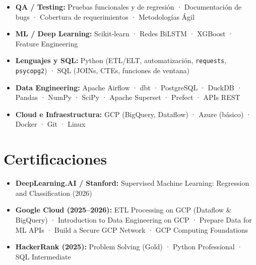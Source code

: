 \documentclass[a4paper,10pt]{article}
\begin{document}
\begin{itemize}
  \item \textbf{QA / Testing:} Pruebas funcionales y de regresi\'{o}n · Documentaci\'{o}n de bugs
        · Cobertura de requerimientos · Metodolog\'{i}as \'{A}gil
  \item \textbf{ML / Deep Learning:} Scikit-learn · Redes BiLSTM · XGBoost · Feature Engineering
  \item \textbf{Lenguajes y SQL:} Python (ETL/ELT, automatizaci\'{o}n, \texttt{requests}, \texttt{psycopg2})
        · SQL (JOINs, CTEs, funciones de ventana)
  \item \textbf{Data Engineering:} Apache Airflow · dbt · PostgreSQL · DuckDB · Pandas · NumPy
        · SciPy · Apache Superset · Prefect · APIs REST
  \item \textbf{Cloud e Infraestructura:} GCP (BigQuery, Dataflow) · Azure (b\'{a}sico) · Docker · Git · Linux
\end{itemize}

\section{Certificaciones}

\begin{itemize}
  \item \textbf{DeepLearning.AI / Stanford:} Supervised Machine Learning: Regression and Classification (2026)
  \item \textbf{Google Cloud (2025--2026):}
        ETL Processing on GCP (Dataflow \& BigQuery) · Introduction to Data Engineering on GCP
        · Prepare Data for ML APIs · Build a Secure GCP Network · GCP Computing Foundations
  \item \textbf{HackerRank (2025):} Problem Solving (Gold) · Python Professional · SQL Intermediate
\end{itemize}
\end{document}
